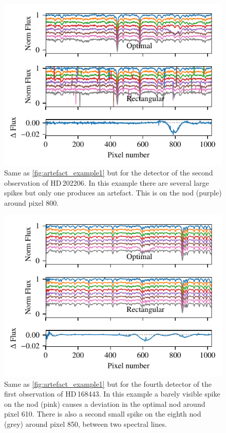 \begin{figure}
    \centering
    \includegraphics[width=0.7\linewidth]{figures/appendix/bp_plots/extraction_comparision_HD202206-2_chip_1}
    \caption[]{Same as \cref{fig:artefact_example1} but for the  detector of the second observation of {HD\,202206}.
        In this example there are several large spikes but only one produces an artefact.
        This is on the  nod (purple) around pixel 800.}
    \label{fig:artefact_example4}
\end{figure}
\begin{figure}
    \centering
    \includegraphics[width=0.7\linewidth]{figures/appendix/bp_plots/extraction_comparision_HD168443-1_chip_4}
    \caption[]{Same as \cref{fig:artefact_example1} but for the fourth detector of the first observation of {HD\,168443}.
        In this example a barely visible spike on the   nod (pink) causes a deviation in the optimal nod around pixel 610.
        There is also a second small spike on the eighth nod (grey) around pixel 850, between two spectral lines.}
    \label{fig:artefact_example5}
\end{figure}
